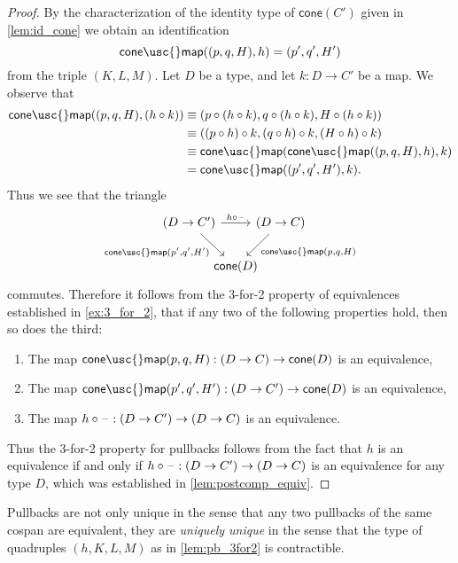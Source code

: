 \begin{proof}
By the characterization of the identity type of $\mathsf{cone}(C')$ given in \cref{lem:id_cone} we obtain an identification
\begin{equation*}
\mathsf{cone\usc{}map}((p,q,H),h)=(p',q',H')
\end{equation*}
from the triple $(K,L,M)$. 
Let $D$ be a type, and let $k:D\to C'$ be a map. We observe that
\begin{align*}
\mathsf{cone\usc{}map}((p,q,H),(h\circ k)) & \jdeq (p\circ (h\circ k),q\circ (h\circ k),H\circ (h\circ k)) \\
& \jdeq ((p\circ h)\circ k,(q\circ h)\circ k, (H\circ h)\circ k) \\
& \jdeq \mathsf{cone\usc{}map}(\mathsf{cone\usc{}map}((p,q,H),h),k) \\
& = \mathsf{cone\usc{}map}((p',q',H'),k).
\end{align*}
Thus we see that the triangle 
\begin{equation*}
\begin{tikzcd}[column sep=-1em]
(D\to C') \arrow[rr,"{h\circ \blank}"] \arrow[dr,swap,"{\mathsf{cone\usc{}map}(p',q',H')}"] & & (D\to C) \arrow[dl,"{\mathsf{cone\usc{}map}(p,q,H)}"] \\
& \mathsf{cone}(D)
\end{tikzcd}
\end{equation*}
commutes. Therefore it follows from the 3-for-2 property of equivalences established in \cref{ex:3_for_2}, that if any two of the following properties hold, then so does the third:
\begin{enumerate}
\item The map $\mathsf{cone\usc{}map}(p,q,H):(D\to C)\to \mathsf{cone}(D)$ is an equivalence,
\item The map $\mathsf{cone\usc{}map}(p',q',H'):(D\to C')\to \mathsf{cone}(D)$ is an equivalence,
\item The map $h\circ\mathord{\hspace{1pt}\text{--}\hspace{1pt}} : (D\to C')\to (D\to C)$ is an equivalence.
\end{enumerate}
Thus the 3-for-2 property for pullbacks follows from the fact that $h$ is an equivalence if and only if $h\circ\mathord{\hspace{1pt}\text{--}\hspace{1pt}} : (D\to C')\to (D\to C)$ is an equivalence for any type $D$, which was established in \cref{lem:postcomp_equiv}.
\end{proof}

Pullbacks are not only unique in the sense that any two pullbacks of the same cospan are equivalent, they are \emph{uniquely unique} in the sense that the type of quadruples $(h,K,L,M)$ as in \cref{lem:pb_3for2} is contractible.

